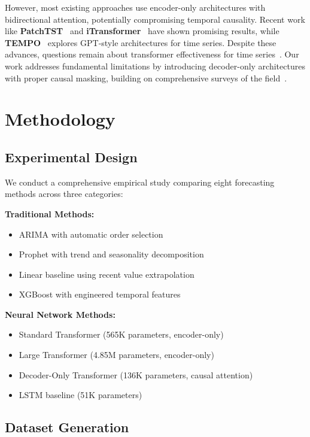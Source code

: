 \documentclass[11pt]{article}
\begin{document}
However, most existing approaches use encoder-only architectures with bidirectional attention, potentially compromising temporal causality. Recent work like \textbf{PatchTST}~\cite{nie2023time} and \textbf{iTransformer}~\cite{liu2024itransformer} have shown promising results, while \textbf{TEMPO}~\cite{chen2024tempo} explores GPT-style architectures for time series. Despite these advances, questions remain about transformer effectiveness for time series~\cite{zeng2023transformers}. Our work addresses fundamental limitations by introducing decoder-only architectures with proper causal masking, building on comprehensive surveys of the field~\cite{wen2022transformers}.

\section{Methodology}

\subsection{Experimental Design}

We conduct a comprehensive empirical study comparing eight forecasting methods across three categories:

\textbf{Traditional Methods:}
\begin{itemize}
\item ARIMA with automatic order selection
\item Prophet with trend and seasonality decomposition  
\item Linear baseline using recent value extrapolation
\item XGBoost with engineered temporal features
\end{itemize}

\textbf{Neural Network Methods:}
\begin{itemize}
\item Standard Transformer (565K parameters, encoder-only)
\item Large Transformer (4.85M parameters, encoder-only)
\item Decoder-Only Transformer (136K parameters, causal attention)
\item LSTM baseline (51K parameters)
\end{itemize}

\subsection{Dataset Generation}
\end{document}
